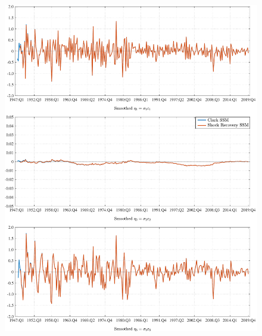 \documentclass[a4paper,12pt]{article}
\begin{document}
\begin{figure}[p!]
\centering
\includegraphics[angle=00, width=1\textwidth,trim={0 0 0 0},clip]{Clark_SSM_Smoothed}
\label{fig:KS}
\end{figure}
\end{document}
